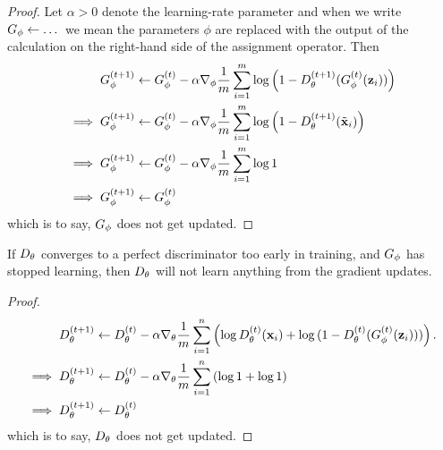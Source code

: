 \begin{proof} Let $\alpha>0$ denote the learning-rate parameter and
  when we write $G_\phi \gets \dots$ we mean the parameters $\phi$ are
  replaced with the output of the calculation on the right-hand side of
  the assignment operator. Then
  \begin{align}
    \label{eq:g-updates-no-good} G_\phi^{(t+1)} & \gets G_\phi^{(t)} -
                                              \alpha\nabla_\phi {1 \over m} \sum_{i=1}^m \log\left( 1 -
                                              D_\theta^{(t+1)}(G_\phi^{(t)}(\mathbf{z}_i)) \right) \\ \implies G_\phi^{(t+1)} & \gets
                                                                                                           G_\phi^{(t)} - \alpha\nabla_\phi {1 \over m} \sum_{i=1}^m \log{ \left( 1 -
                                                                                                           D_\theta^{(t+1)}(\tilde{\mathbf{x}}_i) \right)} \\ \implies G_\phi^{(t+1)} & \gets
                                                                                                                                                                       G_\phi^{(t)} - \alpha\nabla_\phi {1 \over m} \sum_{i=1}^m \log{1} \\
    \implies G_\phi^{(t+1)} & \gets G_\phi^{(t)}
  \end{align} which is to say, $G_\phi$ does not get updated.
\end{proof}

\begin{theorem} If $D_\theta$ converges to a perfect discriminator too early
  in training, and $G_\phi$ has stopped learning, then $D_\theta$ will not learn
  anything from the gradient updates.
\end{theorem}

\begin{proof}
  \begin{align}
    \label{eq:d-updates-no-good} D_\theta^{(t+1)} & \gets D_\theta^{(t)} -
                                              \alpha\nabla_\theta {1 \over m} \sum_{i=1}^n \left( \log
                                              D^{(t)}_\theta(\mathbf{x}_i) + \log{(1 -
                                              D^{(t)}_\theta(G^{(t)}_\phi(\mathbf{z}_i)))} \right). \\ \implies
    D_\theta^{(t+1)} & \gets D_\theta^{(t)} - \alpha\nabla_\theta {1 \over m}
                 \sum_{i=1}^n \left( \log{1} + \log{1} \right) \\ \implies D_\theta^{(t+1)} &
                                                                                        \gets D_\theta^{(t)}
  \end{align} which is to say, $D_\theta$ does not get updated.
\end{proof}

